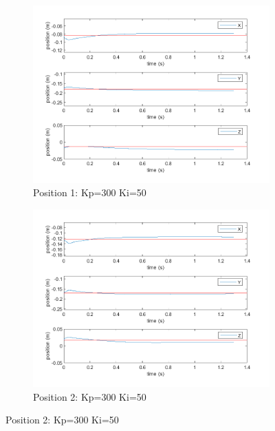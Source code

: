 \begin{figure}[ht]
    \vspace{2pt} %

    \begin{subfigure}[b]{0.45\textwidth}
        \centering
        \includegraphics[width=\linewidth]{Pictures/Controller/Kp300Ki50/1.png}
        \caption{Position 1: Kp=300 Ki=50}
    \end{subfigure}%
    \hfill
    \begin{subfigure}[b]{0.45\textwidth}
        \centering
        \includegraphics[width=\linewidth]{Pictures/Controller/Kp300Ki50/17.png}
        \caption{Position 2: Kp=300 Ki=50}
    \end{subfigure}


\end{figure}
